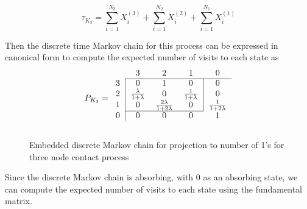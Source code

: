 \begin{equation}
    \tau_{K_3} = \sum_{i = 1}^{N_3} X_i^{(3)} + \sum_{i = 1}^{N_2} X_i^{(2)} + \sum_{i = 1}^{N_1} X_i^{(1)}
\end{equation}

Then the discrete time Markov chain for this process can be expressed in canonical form to compute the expected number of visits to each state as
$$
P_{K_3} = \begin{blockarray}{ccccc}
    & 3 & 2 & 1 & 0\\
    \begin{block}{c|ccc|c}
    \cline{2-5}
        3 & 0 & 1 & 0 & 0 \\
        2 & \frac{\lambda}{1 + \lambda} & 0 &
        \frac{1}{1 + \lambda} & 0\\
        1 & 0 & \frac{2\lambda}{1 + 2 \lambda} & 0 & \frac{1}{1 + 2\lambda}\\
    \cline{2-4}
    \end{block}
    \begin{block}{c|cccc}
    0 & 0 & 0 & 0 & 1\\
    \end{block}
\end{blockarray}
$$

\begin{figure}[H]
    \centering
    \caption{Embedded discrete Markov chain for projection to number of 1's for three node contact process}
    \label{fig:discrete_mc_three_contact}
\end{figure}

Since the discrete Markov chain is absorbing, with 0 as an absorbing state, we can compute the expected number of visits to each state using the fundamental matrix.

